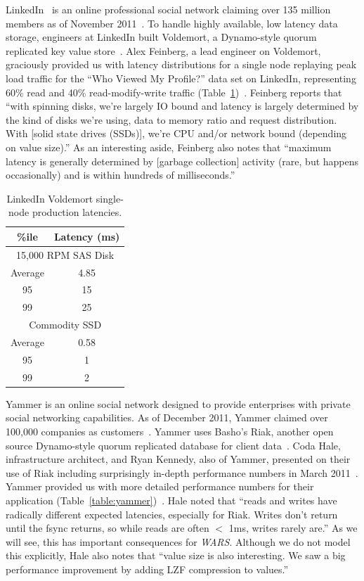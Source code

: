 \documentclass{vldb}
\begin{document}
LinkedIn~\cite{linkedin} is an online professional social network
claiming over 135 million members as of November
2011~\cite{linkedinmembers}. To handle highly available, low latency
data storage, engineers at LinkedIn built Voldemort, a Dynamo-style
quorum replicated key value store~\cite{voldemort, voldemortpub}.
Alex Feinberg, a lead engineer on Voldemort, graciously provided us
with latency distributions for a single node replaying peak load
traffic for the ``Who Viewed My Profile?'' data set on LinkedIn,
representing 60\% read and 40\% read-modify-write traffic
(Table~\ref{table:linkedin})~\cite{feinbergpc}.  Feinberg reports that
``with spinning disks, we're largely IO bound and latency is largely
determined by the kind of disks we're using, data to memory ratio and
request distribution.  With [solid state drives (SSDs)], we're CPU
and/or network bound (depending on value size).''  As an interesting
aside, Feinberg also notes that ``maximum latency is generally
determined by [garbage collection] activity (rare, but happens occasionally) and is
within hundreds of milliseconds.''

\begin{table}
\centering
\begin{tabular}{|c|c|}
\hline
\%ile & Latency (ms) \\
\hline
\multicolumn{2}{|c|}{ 15,000 RPM SAS Disk}\\
\hline
Average & 4.85\\
95 & 15\\
99 & 25\\
\hline
\multicolumn{2}{|c|}{ Commodity SSD }\\
\hline
Average & 0.58 \\
95 & 1\\
99 & 2\\
\hline
\end{tabular}
\caption{LinkedIn Voldemort single-node production latencies.}
\label{table:linkedin}
\end{table}

Yammer is an online social network designed to provide enterprises
with private social networking capabilities.  As of December 2011,
Yammer claimed over 100,000 companies as customers~\cite{yammer}.
Yammer uses Basho's Riak, another open source Dynamo-style quorum
replicated database for client data~\cite{riak}.  Coda Hale,
infrastructure architect, and Ryan Kennedy, also of Yammer, presented
on their use of Riak including surprisingly in-depth performance
numbers in March 2011~\cite{riakyammer}.  Yammer provided us with more
detailed performance numbers for their application
(Table~\ref{table:yammer})~\cite{codapc}.  Hale noted that ``reads and
writes have radically different expected latencies, especially for
Riak. Writes don't return until the fsync returns, so while reads are
often $<$ 1ms, writes rarely are.''  As we will see, this has
important consequences for \textit{WARS}.  Although we do not model
this explicitly, Hale also notes that ``value size is also
interesting. We saw a big performance improvement by adding LZF
compression to values.''
\end{document}
